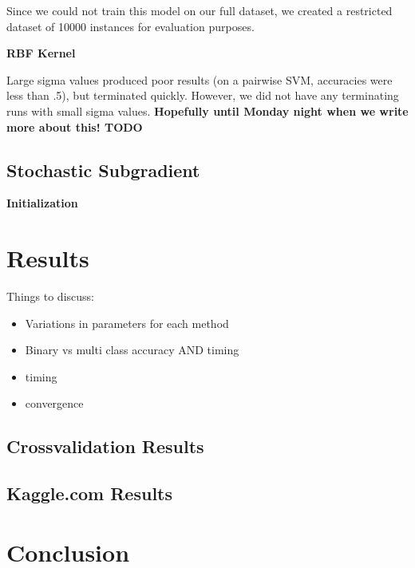 \documentclass[letterpaper, 11pt]{article}
\begin{document}
Since we could not train this model on our full dataset, we created a restricted dataset of 10000 instances for evaluation purposes.

\textbf{RBF Kernel}

Large sigma values produced poor results (on a pairwise SVM, accuracies were less than .5), but terminated quickly.  However, we did not have any terminating runs with small sigma values. \textbf{Hopefully until Monday night when we write more about this! TODO}


\subsection{Stochastic Subgradient}

\textbf{Initialization}


\section{Results}
Things to discuss:
\begin{itemize}
	\item Variations in parameters for each method
	\item Binary vs multi class accuracy AND timing
	\item timing
	\item convergence
\end{itemize}

\subsection{Crossvalidation Results}


\subsection{Kaggle.com Results}

\section{Conclusion}



\nocite{*}
 

\end{document}
